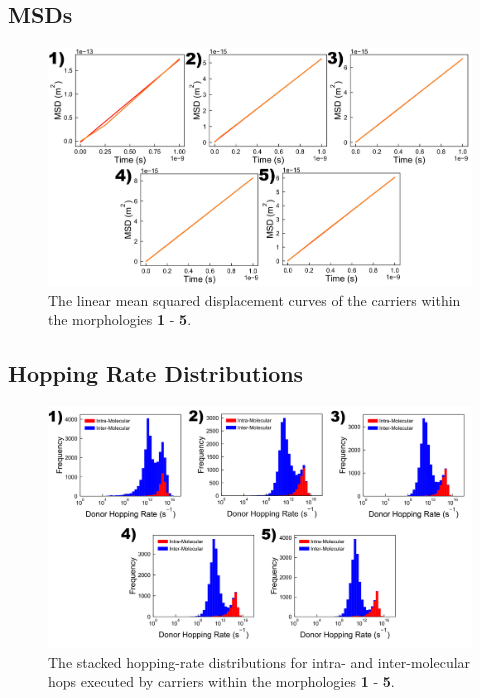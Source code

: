 \documentclass[12pt]{article}
\begin{document}
\clearpage
\subsection{MSDs}


\begin{figure}[h!]\centering
	\includegraphics[width=\textwidth]{Figures/LinMSDHole.pdf}
    \caption{The linear mean squared displacement curves of the carriers within the morphologies \textbf{1} - \textbf{5}.}
	\label{fig:MSD}
\end{figure}


\clearpage
\subsection{Hopping Rate Distributions}

\begin{figure}[h!]\centering
    \includegraphics[width=\textwidth]{Figures/DonorHoppingRateMixed.png}
    \caption{The stacked hopping-rate distributions for intra- and inter-molecular hops executed by carriers within the morphologies \textbf{1} - \textbf{5}.}
	\label{fig:HoppingRateMixed}
\end{figure}

\clearpage




\end{document}
